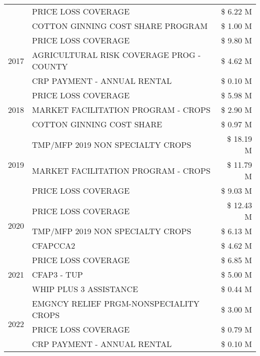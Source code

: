 \begin{tabular}{llr}
 & PRICE LOSS COVERAGE & \$ 6.22 M \\
 & COTTON GINNING COST SHARE PROGRAM & \$ 1.00 M \\
\cline{1-3}
\multirow[t]{3}{*}{2017} & PRICE LOSS COVERAGE & \$ 9.80 M \\
 & AGRICULTURAL RISK COVERAGE PROG - COUNTY & \$ 4.62 M \\
 & CRP PAYMENT - ANNUAL RENTAL & \$ 0.10 M \\
\cline{1-3}
\multirow[t]{3}{*}{2018} & PRICE LOSS COVERAGE & \$ 5.98 M \\
 & MARKET FACILITATION PROGRAM - CROPS & \$ 2.90 M \\
 & COTTON GINNING COST SHARE & \$ 0.97 M \\
\cline{1-3}
\multirow[t]{3}{*}{2019} & TMP/MFP 2019 NON SPECIALTY CROPS & \$ 18.19 M \\
 & MARKET FACILITATION PROGRAM - CROPS & \$ 11.79 M \\
 & PRICE LOSS COVERAGE & \$ 9.03 M \\
\cline{1-3}
\multirow[t]{3}{*}{2020} & PRICE LOSS COVERAGE & \$ 12.43 M \\
 & TMP/MFP 2019 NON SPECIALTY CROPS & \$ 6.13 M \\
 & CFAPCCA2 & \$ 4.62 M \\
\cline{1-3}
\multirow[t]{3}{*}{2021} & PRICE LOSS COVERAGE & \$ 6.85 M \\
 & CFAP3 - TUP & \$ 5.00 M \\
 & WHIP PLUS 3 ASSISTANCE & \$ 0.44 M \\
\cline{1-3}
\multirow[t]{3}{*}{2022} & EMGNCY RELIEF PRGM-NONSPECIALITY CROPS & \$ 3.00 M \\
 & PRICE LOSS COVERAGE & \$ 0.79 M \\
 & CRP PAYMENT - ANNUAL RENTAL & \$ 0.10 M \\
\cline{1-3}
\bottomrule
\end{tabular}
